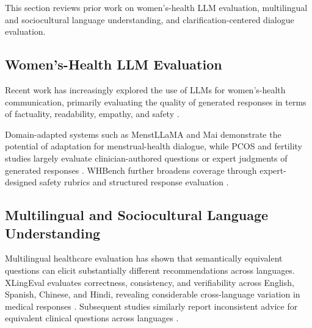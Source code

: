 This section reviews prior work on women's-health LLM evaluation,
multilingual and sociocultural language understanding, and
clarification-centered dialogue evaluation.
\subsection{Women's-Health LLM Evaluation}

Recent work has increasingly explored the use of LLMs for women's-health communication, primarily evaluating the quality of generated responses in terms of factuality, readability, empathy, and safety \citep{recker-etal-2025-large,devries-etal-2025-enhancing}.

Domain-adapted systems such as MenstLLaMA \citep{adhikary-etal-2025-menstrual} and Mai \citep{mughal-etal-2025-mai} demonstrate the potential of adaptation for menstrual-health dialogue, while PCOS and fertility studies largely evaluate clinician-authored questions or expert judgments of generated responses \citep{devranoglu-etal-2024-chatgpt,graca-etal-2026-assessing,chervenak-etal-2023-promise,gely-etal-2026-large}. WHBench further broadens coverage through expert-designed safety rubrics and structured response evaluation \citep{maurya-etal-2026-whbench}.





\subsection{Multilingual and Sociocultural Language Understanding}

Multilingual healthcare evaluation has shown that semantically equivalent
questions can elicit substantially different recommendations across
languages.
XLingEval evaluates correctness, consistency, and verifiability across
English, Spanish, Chinese, and Hindi, revealing considerable cross-language
variation in medical responses
\citep{jin-etal-2024-better}.
Subsequent studies similarly report inconsistent advice for equivalent
clinical questions across languages
\citep{schlicht-etal-2025-consistent}.


